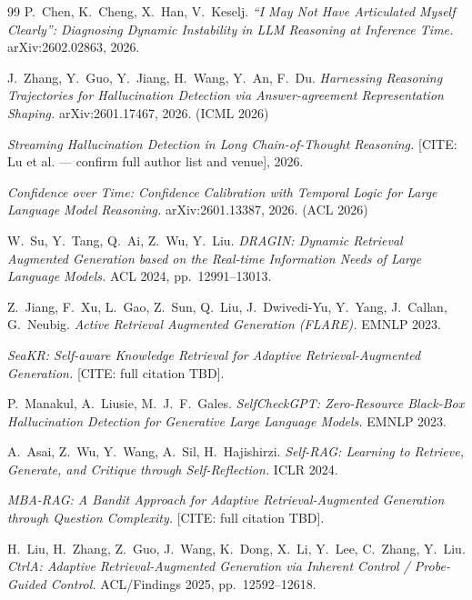 \documentclass[11pt]{article}
\newcommand{\CITE}[1]{{\color{orange}\textsf{[CITE: #1]}}}
\begin{document}
\begin{thebibliography}{99}
P.~Chen, K.~Cheng, X.~Han, V.~Keselj.
\textit{``I May Not Have Articulated Myself Clearly'': Diagnosing Dynamic
Instability in LLM Reasoning at Inference Time.} arXiv:2602.02863, 2026.

J.~Zhang, Y.~Guo, Y.~Jiang, H.~Wang, Y.~An, F.~Du.
\textit{Harnessing Reasoning Trajectories for Hallucination Detection via
Answer-agreement Representation Shaping.} arXiv:2601.17467, 2026. (ICML 2026)

\textit{Streaming Hallucination Detection in Long Chain-of-Thought
Reasoning.} \CITE{Lu et al. — confirm full author list and venue}, 2026.

\textit{Confidence over Time: Confidence Calibration with Temporal Logic
for Large Language Model Reasoning.} arXiv:2601.13387, 2026. (ACL 2026)

W.~Su, Y.~Tang, Q.~Ai, Z.~Wu, Y.~Liu.
\textit{DRAGIN: Dynamic Retrieval Augmented Generation based on the
Real-time Information Needs of Large Language Models.} ACL 2024,
pp.~12991--13013.

Z.~Jiang, F.~Xu, L.~Gao, Z.~Sun, Q.~Liu, J.~Dwivedi-Yu, Y.~Yang, J.~Callan,
G.~Neubig.
\textit{Active Retrieval Augmented Generation (FLARE).} EMNLP 2023.

\textit{SeaKR: Self-aware Knowledge Retrieval for Adaptive
Retrieval-Augmented Generation.} \CITE{full citation TBD}.

P.~Manakul, A.~Liusie, M.~J.~F.~Gales.
\textit{SelfCheckGPT: Zero-Resource Black-Box Hallucination Detection for
Generative Large Language Models.} EMNLP 2023.

A.~Asai, Z.~Wu, Y.~Wang, A.~Sil, H.~Hajishirzi.
\textit{Self-RAG: Learning to Retrieve, Generate, and Critique through
Self-Reflection.} ICLR 2024.

\textit{MBA-RAG: A Bandit Approach for Adaptive Retrieval-Augmented
Generation through Question Complexity.} \CITE{full citation TBD}.

H.~Liu, H.~Zhang, Z.~Guo, J.~Wang, K.~Dong, X.~Li, Y.~Lee, C.~Zhang, Y.~Liu.
\textit{CtrlA: Adaptive Retrieval-Augmented Generation via Inherent
Control / Probe-Guided Control.} ACL/Findings 2025, pp.~12592--12618.


\end{thebibliography}
\end{document}
